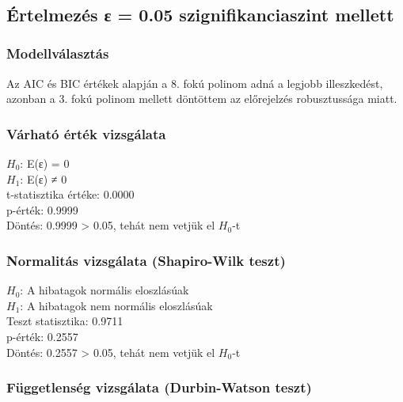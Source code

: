 \documentclass[11pt]{article}
\begin{document}
    \begin{center}
    \end{center}
    { \hspace*{\fill} \\}
    
    \subsection{Értelmezés ε = 0.05 szignifikanciaszint
mellett}\label{uxe9rtelmezuxe9s-ux3b5-0.05-szignifikanciaszint-mellett}

\subsubsection{Modellválasztás}\label{modellvuxe1lasztuxe1s}

Az AIC és BIC értékek alapján a 8. fokú polinom adná a legjobb
illeszkedést, azonban a 3. fokú polinom mellett döntöttem az előrejelzés
robusztussága miatt.

\subsubsection{Várható érték
vizsgálata}\label{vuxe1rhatuxf3-uxe9rtuxe9k-vizsguxe1lata}

$H_0$: E(ε) = 0\\
$H_1$: E(ε) ≠ 0\\
t-statisztika értéke: 0.0000\\
p-érték: 0.9999\\
Döntés: 0.9999 \textgreater{} 0.05, tehát nem vetjük el $H_0$-t

\subsubsection{Normalitás vizsgálata (Shapiro-Wilk
teszt)}\label{normalituxe1s-vizsguxe1lata-shapiro-wilk-teszt}

$H_0$: A hibatagok normális eloszlásúak\\
$H_1$: A hibatagok nem normális eloszlásúak\\
Teszt statisztika: 0.9711\\
p-érték: 0.2557\\
Döntés: 0.2557 \textgreater{} 0.05, tehát nem vetjük el $H_0$-t

\subsubsection{Függetlenség vizsgálata (Durbin-Watson
teszt)}\label{fuxfcggetlensuxe9g-vizsguxe1lata-durbin-watson-teszt}
\end{document}
